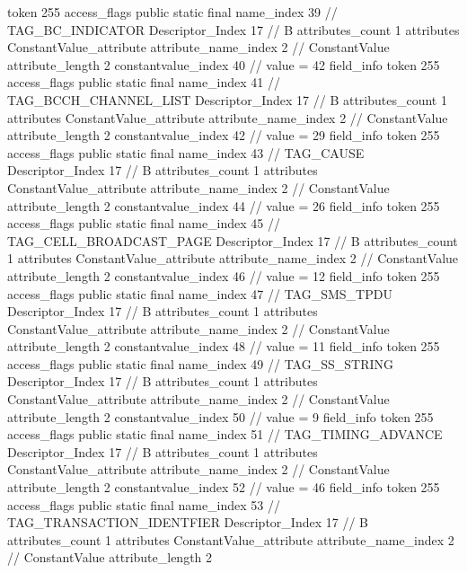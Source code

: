 {{{{{				token	255
				access_flags	public static final
				name_index	39		// TAG_BC_INDICATOR
				Descriptor_Index	17		// B
				attributes_count	1
				attributes {
				ConstantValue_attribute {
					attribute_name_index	2		// ConstantValue
					attribute_length	2
					constantvalue_index	40		// value = 42
				}
				}
			}
			field_info {
				token	255
				access_flags	public static final
				name_index	41		// TAG_BCCH_CHANNEL_LIST
				Descriptor_Index	17		// B
				attributes_count	1
				attributes {
				ConstantValue_attribute {
					attribute_name_index	2		// ConstantValue
					attribute_length	2
					constantvalue_index	42		// value = 29
				}
				}
			}
			field_info {
				token	255
				access_flags	public static final
				name_index	43		// TAG_CAUSE
				Descriptor_Index	17		// B
				attributes_count	1
				attributes {
				ConstantValue_attribute {
					attribute_name_index	2		// ConstantValue
					attribute_length	2
					constantvalue_index	44		// value = 26
				}
				}
			}
			field_info {
				token	255
				access_flags	public static final
				name_index	45		// TAG_CELL_BROADCAST_PAGE
				Descriptor_Index	17		// B
				attributes_count	1
				attributes {
				ConstantValue_attribute {
					attribute_name_index	2		// ConstantValue
					attribute_length	2
					constantvalue_index	46		// value = 12
				}
				}
			}
			field_info {
				token	255
				access_flags	public static final
				name_index	47		// TAG_SMS_TPDU
				Descriptor_Index	17		// B
				attributes_count	1
				attributes {
				ConstantValue_attribute {
					attribute_name_index	2		// ConstantValue
					attribute_length	2
					constantvalue_index	48		// value = 11
				}
				}
			}
			field_info {
				token	255
				access_flags	public static final
				name_index	49		// TAG_SS_STRING
				Descriptor_Index	17		// B
				attributes_count	1
				attributes {
				ConstantValue_attribute {
					attribute_name_index	2		// ConstantValue
					attribute_length	2
					constantvalue_index	50		// value = 9
				}
				}
			}
			field_info {
				token	255
				access_flags	public static final
				name_index	51		// TAG_TIMING_ADVANCE
				Descriptor_Index	17		// B
				attributes_count	1
				attributes {
				ConstantValue_attribute {
					attribute_name_index	2		// ConstantValue
					attribute_length	2
					constantvalue_index	52		// value = 46
				}
				}
			}
			field_info {
				token	255
				access_flags	public static final
				name_index	53		// TAG_TRANSACTION_IDENTFIER
				Descriptor_Index	17		// B
				attributes_count	1
				attributes {
				ConstantValue_attribute {
					attribute_name_index	2		// ConstantValue
					attribute_length	2
}}}}}}}
